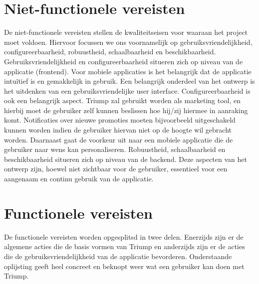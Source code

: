 \section{Niet-functionele vereisten}
De niet-functionele vereisten stellen de kwaliteitseisen voor waaraan het project moet voldoen. Hiervoor focussen we ons voornamelijk op gebruiksvriendelijkheid, configureerbaarheid, robuustheid, schaalbaarheid en beschikbaarheid.
Gebruiksvriendelijkheid en configureerbaarheid situeren zich op niveau van de applicatie (frontend). Voor mobiele applicaties is het belangrijk dat de applicatie intuïtief is en gemakkelijk in gebruik. Een belangrijk onderdeel van het ontwerp is het uitdenken van een gebruiksvriendelijke user interface. Configureerbaarheid is ook een belangrijk aspect. Triump zal gebruikt worden als marketing tool, en hierbij moet de gebruiker zelf kunnen beslissen hoe hij/zij hiermee in aanraking komt. Notificaties over nieuwe promoties moeten bijvoorbeeld uitgeschakeld kunnen worden indien de gebruiker hiervan niet op de hoogte wil gebracht worden. Daarnaast gaat de voorkeur uit naar een mobiele applicatie die de gebruiker naar wens kan personaliseren.
Robuustheid, schaalbaarheid en beschikbaarheid situeren zich op niveau van de backend. Deze aspecten van het ontwerp zijn, hoewel niet zichtbaar voor de gebruiker, essentieel voor een aangenaam en continu gebruik van de applicatie.
\section{Functionele vereisten}
De functionele vereisten worden opgesplitsd in twee delen. Enerzijds zijn er de algemene acties die de basis vormen van Triump en anderzijds zijn er de acties die de gebruiksvriendelijkheid van de applicatie bevorderen. Onderstaande oplijsting geeft heel concreet en beknopt weer wat een gebruiker kan doen met Triump.

